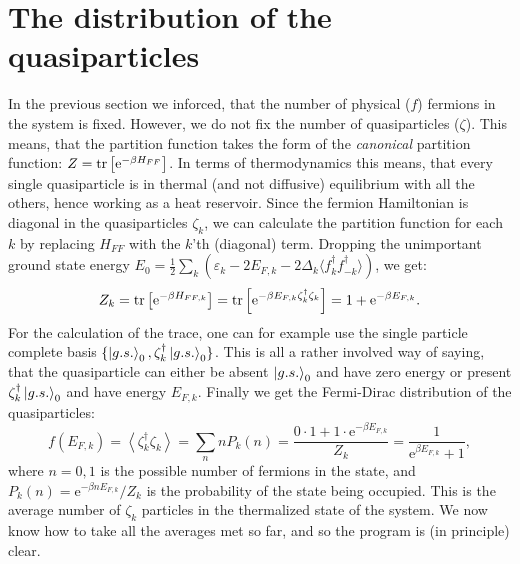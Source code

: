 \section{The distribution of the quasiparticles}
In the previous section we inforced, that the number of physical ($f$) fermions in the system is fixed. However, we do not fix the number of quasiparticles ($\zeta$). This means, that the partition function takes the form of the \textit{canonical} partition function: $Z = \operatorname{tr}\left[\text{e}^{-\beta H_{FF}}\right]$. In terms of thermodynamics this means, that every single quasiparticle is in thermal (and not diffusive) equilibrium with all the others, hence working as a heat reservoir. Since the fermion Hamiltonian is diagonal in the quasiparticles $\zeta_k$, we can calculate the partition function for each $k$ by replacing $H_{FF}$ with the $k$'th (diagonal) term. Dropping the unimportant ground state energy $E_0 = \frac{1}{2}\sum_k (\varepsilon_k-2E_{F,k}-2\Delta_k\langle f^\dagger_k f^\dagger_{-k}\rangle)$, we get:
\begin{equation}
Z_k = \operatorname{tr}\left[\text{e}^{-\beta H_{FF,k}}\right] = \operatorname{tr}\left[\text{e}^{-\beta E_{F,k}\zeta^\dagger_k\zeta_k }\right] = 1 + \text{e}^{-\beta E_{F,k}}. 
\end{equation}     
For the calculation of the trace, one can for example use the single particle complete basis $\{\ket{g.s.}_0, \zeta^\dagger_k\ket{g.s.}_0 \}$. This is all a rather involved way of saying, that the quasiparticle can either be absent $\ket{g.s.}_0$ and have zero energy or present $\zeta^\dagger_k\ket{g.s.}_0$ and have energy $E_{F,k}$. Finally we get the Fermi-Dirac distribution of the quasiparticles:
\begin{equation}
f(E_{F,k}) = \left\langle \zeta^\dagger_k\zeta_k \right\rangle = \sum_n n P_k(n) = \frac{0\cdot 1 + 1 \cdot \text{e}^{-\beta E_{F,k}} }{Z_k} = \frac{1}{\text{e}^{\beta E_{F,k}} + 1}, 
\end{equation}
where $n=0,1$ is the possible number of fermions in the state, and $P_k(n) = \text{e}^{-\beta n E_{F,k}}/Z_k$ is the probability of the state being occupied\cite{PlischkeStatPhys,SchroederThermal}. This is the average number of $\zeta_k$ particles in the thermalized state of the system. We now know how to take all the averages met so far, and so the program is (in principle) clear.  

